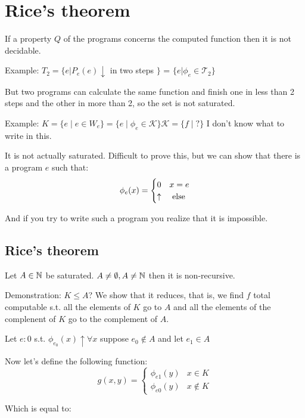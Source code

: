 \chapter {Rice's theorem}

If a property $Q$ of the programs concerns the computed function then it is not decidable.

Example: $ T_2 = \{ e | P_e(e)\downarrow $ in two steps $ \} $ = $ \{e|\phi_e \in \mathcal{T}_2 \} $

But two programs can calculate the same function and finish one in less than 2 steps and the other in more than 2, so the set is not saturated.

Example: $ K = \{e \mid e\in W_e \} = \{e \mid \phi_e\in \mathcal{K} \} \mathcal{K} = \{f \mid ? \}$ I don't know what to write in this.

It is not actually saturated. Difficult to prove this, but we can show that there is a program $e$ such that:
\begin{equation*}
  \phi_e(x) = \begin{cases}
    0        & x = e    \\
    \uparrow & $ else $
  \end{cases}
\end{equation*}

And if you try to write such a program you realize that it is impossible.

\section {Rice's theorem}
Let $ A \in \mathbb{N} $ be saturated. $ A \not= \emptyset, A \not= \mathbb{N} $ then it is non-recursive.

Demonstration: $ K \leq A $? We show that it reduces, that is, we find $f$ total computable s.t. all the elements of $K$ go to $A$ and all the elements of the complenent of $K$ go to the complement of $A$.

Let $ e:0 $ s.t. $ \phi_{e_0}(x)\uparrow\forall x $ suppose $ e_0\not\in A $ and let $ e_1\in A $

Now let's define the following function:
\begin{equation*}
  g(x,y) = \begin{cases}
    \phi_{e1}(y) & x \in K     \\
    \phi_{e0}(y) & x \not\in K
  \end{cases}
\end{equation*}

Which is equal to:

